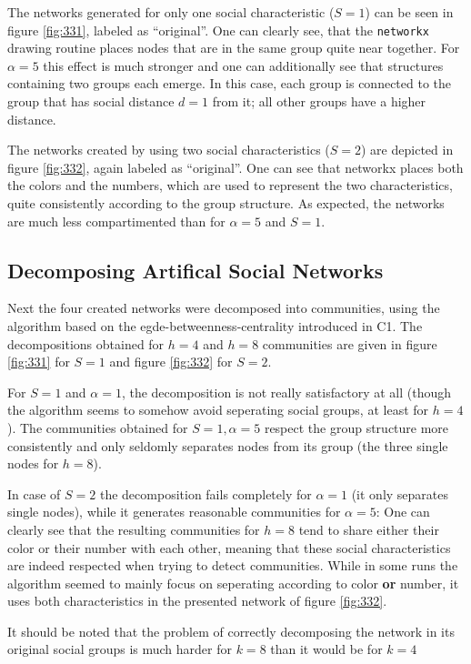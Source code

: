 \documentclass{scrartcl}
\begin{document}
The networks generated for only one social characteristic ($S = 1$) can be
seen in figure \ref{fig:331}, labeled as \enquote{original}. One can
clearly see, that the \texttt{networkx} drawing routine places nodes that
are in the same group quite near together. For $\alpha = 5$ this effect is much
stronger and one can additionally see that structures containing two groups
each emerge. In this case, each group is connected to the group that has 
social distance $d = 1$ from it; all other groups have a higher distance.

The networks created by using two social characteristics ($S = 2$) are
depicted in figure \ref{fig:332}, again labeled as \enquote{original}. One
can see that networkx places both the colors and the numbers, which are
used to represent the two characteristics, quite consistently according to
the group structure. As expected, the networks are much less compartimented
than for $\alpha = 5$ and $S= 1$.

\subsection{Decomposing Artifical Social Networks}
Next the four created networks were decomposed into communities, using the
algorithm based on the egde-betweenness-centrality introduced in C1.
The decompositions obtained for $h = 4$ and $h = 8$ communities are given
in figure \ref{fig:331} for $S = 1$ and figure \ref{fig:332}  for $S = 2$.

For $S = 1$ and $\alpha = 1$, the decomposition is not really satisfactory
at all (though the algorithm seems to somehow avoid seperating social
groups, at least for $h = 4$).
The communities obtained for $S=1, \alpha = 5$ respect the group structure
more consistently and only seldomly separates nodes from its group (the
three single nodes for $h = 8$).

In case of $S=2$ the decomposition fails completely for $\alpha = 1$ (it
only separates single nodes), while it generates reasonable communities for
$\alpha = 5$: One can clearly see that the resulting communities for $h
= 8$ tend to share either their color or their number with each other, meaning that
these social characteristics are indeed respected when trying to detect
communities.  While in some runs the algorithm seemed to mainly focus on
seperating according to color \textbf{or} number, it uses both
characteristics in the presented network of figure \ref{fig:332}.

It should be noted that the problem of correctly decomposing the network in
its original social groups is much harder for $k = 8$ than it would be for
$k = 4$
\end{document}
